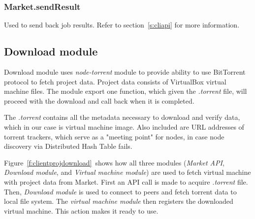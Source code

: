 \subsubsection*{Market.sendResult}

Used to send back job results. Refer to section~\ref{s:cliapi} for more information.

\subsection{Download module}

Download module uses \emph{node-torrent} module to provide ability to use BitTorrent protocol to fetch project data. Project data consists of VirtualBox virtual machine files. The module export one function, which given the \emph{.torrent} file, will proceed with the download and call back when it is completed.

The \emph{.torrent} contains all the metadata necessary to download and verify data, which in our case is virtual machine image. Also included are URL addresses of torrent trackers, which serve as a "meeting point" for nodes, in case node discovery via Distributed Hash Table fails.

Figure~\ref{f:clientprojdownload}~shows how all three modules (\emph{Market API}, \emph{Download module}, and \emph{Virtual machine module}) are used to fetch virtual machine with project data from Market. First an API call is made to acquire \emph{.torrent} file. Then, \emph{Download module} is used to connect to peers and fetch torrent data to local file system. The \emph{virtual machine module} then registers the downloaded virtual machine. This action makes it ready to use.

